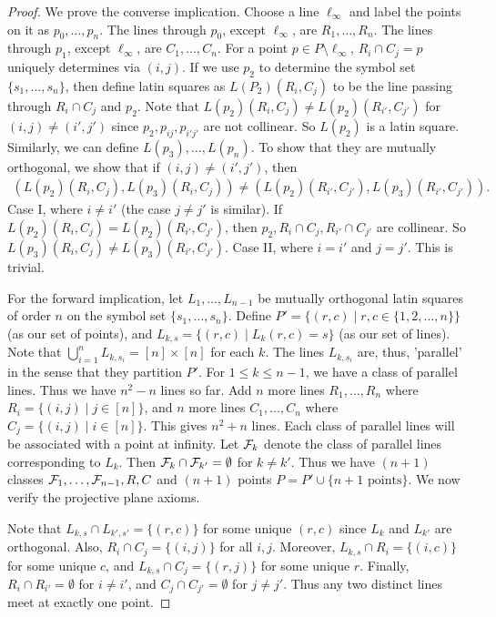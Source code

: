 \begin{proof}
    We prove the converse implication. Choose a line $\ell_{\infty}$ and label the points on it as $p_{0},\ldots,p_{n}$. The lines through $p_{0}$, except $\ell_{\infty}$, are $R_{1},\ldots,R_{n}$. The lines through $p_{1}$, except $\ell_{\infty}$, are $C_{1},\ldots,C_{n}$. For a point $p \in P\setminus \ell_{\infty}$, $R_{i} \cap C_{j} = p$ uniquely determines via $(i,j)$. If we use $p_{2}$ to determine the symbol set $\{s_{1},\ldots,s_{n}\}$, then define latin squares as $L(P_{2})(R_{i},C_{j})$ to be the line passing through $R_{i} \cap C_{j}$ and $p_{2}$. Note that $L(p_{2})(R_{i},C_{j}) \neq L(p_{2})(R_{i'},C_{j'})$ for $(i,j) \neq (i',j')$ since $p_{2},p_{ij},p_{i'j'}$ are not collinear. So $L(p_{2})$ is a latin square. Similarly, we can define $L(p_{3}),\ldots,L(p_{n})$. To show that they are mutually orthogonal, we show that if $(i,j) \neq (i',j')$, then
    \begin{align}
        (L(p_{2})(R_{i},C_{j}), L(p_{3})(R_{i},C_{j})) \neq (L(p_{2})(R_{i'},C_{j'}), L(p_{3})(R_{i'},C_{j'})).
    \end{align}
    Case I, where $i \neq i'$ (the case $j \neq j'$ is similar). If $L(p_{2})(R_{i},C_{j}) = L(p_{2})(R_{i'},C_{j'})$, then $p_{2},R_{i} \cap C_{j},R_{i'} \cap C_{j'}$ are collinear. So $L(p_{3})(R_{i},C_{j}) \neq L(p_{3})(R_{i'},C_{j'})$. Case II, where $i = i'$ and $j = j'$. This is trivial.

    For the forward implication, let $L_{1},\ldots,L_{n-1}$ be mutually orthogonal latin squares of order $n$ on the symbol set $\{s_{1},\ldots,s_{n}\}$. Define $P' = \{(r,c) \mid r,c \in \{1,2,\ldots,n\}\}$ (as our set of points), and $L_{k,s} = \{(r,c) \mid L_{k}(r,c) = s\}$ (as our set of lines). Note that $\bigcup_{i=1}^{n} L_{k,s_{i}} = [n] \times [n]$ for each $k$. The lines $L_{k,s_{i}}$ are, thus, 'parallel' in the sense that they partition $P'$. For $1 \leq k \leq n-1$, we have a class of parallel lines. Thus we have $n^{2} - n$ lines so far. Add $n$ more lines $R_{1},\ldots,R_{n}$ where $R_{i} = \{(i,j) \mid j \in [n]\}$, and $n$ more lines $C_{1},\ldots,C_{n}$ where $C_{j} = \{(i,j) \mid i \in [n]\}$. This gives $n^{2} + n$ lines. Each class of parallel lines will be associated with a point at infinity. Let $\mathcal{F}_{k}$ denote the class of parallel lines corresponding to $L_{k}$. Then $\mathcal{F}_{k} \cap \mathcal{F}_{k'} = \emptyset$ for $k \neq k'$. Thus we have $(n+1)$ classes $\mathcal{F}_{1},\ldots,\mathcal{F}_{n-1},R,C$ and $(n+1)$ points $P = P' \cup \{n+1 \text{ points}\}$. We now verify the projective plane axioms.
    
    
    Note that $L_{k,s} \cap L_{k',s'} = \{(r,c)\}$ for some unique $(r,c)$ since $L_{k}$ and $L_{k'}$ are orthogonal. Also, $R_{i} \cap C_{j} = \{(i,j)\}$ for all $i,j$. Moreover, $L_{k,s} \cap R_{i} = \{(i,c)\}$ for some unique $c$, and $L_{k,s} \cap C_{j} = \{(r,j)\}$ for some unique $r$. Finally, $R_{i} \cap R_{i'} = \emptyset$ for $i \neq i'$, and $C_{j} \cap C_{j'} = \emptyset$ for $j \neq j'$. Thus any two distinct lines meet at exactly one point.
\end{proof}


